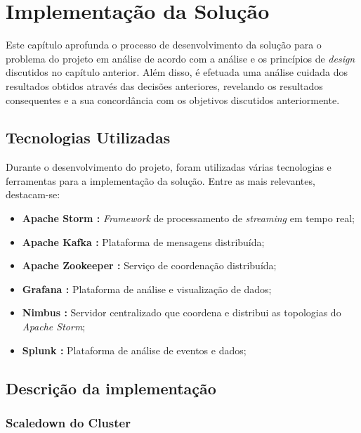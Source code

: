 \chapter{Implementação da Solução}
\label{sec:4-Implementacao}

Este capítulo aprofunda o processo de desenvolvimento da solução para o problema do projeto em 
análise de acordo com a análise e os princípios de \textit{design} discutidos no capítulo anterior. 
Além disso, é efetuada uma análise cuidada dos resultados obtidos através das decisões anteriores, 
revelando os resultados consequentes e a sua concordância com os objetivos discutidos anteriormente.

\section{Tecnologias Utilizadas}

Durante o desenvolvimento do projeto, foram utilizadas várias tecnologias e ferramentas para a 
implementação da solução. Entre as mais relevantes, destacam-se:

\begin{itemize}
  \item \textbf{Apache Storm \cite{storm}:} \textit{Framework} de processamento de 
    \textit{streaming} em tempo real;
  \item \textbf{Apache Kafka \cite{kafka}:} Plataforma de mensagens distribuída;
  \item \textbf{Apache Zookeeper \cite{zookeeper}:} Serviço de coordenação distribuída;
  \item \textbf{Grafana \cite{grafana}:} Plataforma de análise e visualização de dados;
  \item \textbf{Nimbus \cite{nimbus}:} Servidor centralizado que coordena e distribui as topologias 
    do \textit{Apache Storm};
  \item \textbf{Splunk \cite{splunk}:} Plataforma de análise de eventos e dados;
\end{itemize}

\section{Descrição da implementação}


\subsection{Scaledown do Cluster}

